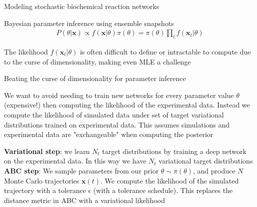 \documentclass[aspectratio=1610]{beamer}					%
\begin{document}
\begin{section}{Modeling stochastic biochemical reaction networks}
\begin{frame}{Bayesian parameter inference using ensemble snapshots}
\begin{align*}
P(\theta|\mathbf{x}) \propto f(\mathbf{x}|\theta)\pi(\theta) = \pi(\theta)\prod_{t} f(\mathbf{x}_{t}|\theta)
\end{align*}

The likelihood $f(\mathbf{x}_{t}|\theta)$ is often difficult to define or intractable to compute due to the curse of dimensionality, making even MLE a challenge

\end{frame}


\end{section}

\begin{frame}{Beating the curse of dimensionality for parameter inference}

We want to avoid needing to train new networks for every parameter value $\theta$ (expensive!) then computing the likelihood of the experimental data. Instead we compute the likelihood of simulated data under set of target variational distributions trained on experimental data. This assumes simulations and experimental data are "exchangeable" when computing the posterior

\vspace{0.2in}
\textbf{Variational step}: we learn $N_{t}$ target distributions by training a deep network on the experimental data. In this way we have $N_{t}$ variational target distributions\\
\vspace{0.2in}
\textbf{ABC step}: We sample parameters from our prior $\theta \sim \pi(\theta)$, and produce $N$ Monte Carlo trajectories $\mathbf{x}(t)$. We compute the likelihood of the simulated trajectory with a tolerance $\epsilon$ (with a tolerance schedule). This replaces the distance metric in ABC with a variational likelihood

\end{frame}
\end{document}
